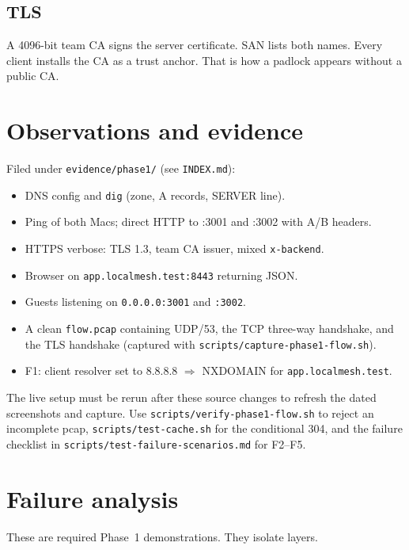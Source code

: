 \documentclass[11pt,a4paper]{article}
\begin{document}
\subsection{TLS}
A 4096-bit team CA signs the server certificate. SAN lists both names. Every client
installs the CA as a trust anchor. That is how a padlock appears without a public CA.

\section{Observations and evidence}
Filed under \texttt{evidence/phase1/} (see \texttt{INDEX.md}):

\begin{itemize}
  \item DNS config and \texttt{dig} (zone, A records, SERVER line).
  \item Ping of both Macs; direct HTTP to :3001 and :3002 with A/B headers.
  \item HTTPS verbose: TLS 1.3, team CA issuer, mixed \texttt{x-backend}.
  \item Browser on \texttt{app.localmesh.test:8443} returning JSON.
  \item Guests listening on \texttt{0.0.0.0:3001} and \texttt{:3002}.
  \item A clean \texttt{flow.pcap} containing UDP/53, the TCP three-way handshake,
        and the TLS handshake (captured with \texttt{scripts/capture-phase1-flow.sh}).
  \item F1: client resolver set to 8.8.8.8 $\Rightarrow$ NXDOMAIN for \texttt{app.localmesh.test}.
\end{itemize}

The live setup must be rerun after these source changes to refresh the dated
screenshots and capture. Use \texttt{scripts/verify-phase1-flow.sh} to reject an
incomplete pcap, \texttt{scripts/test-cache.sh} for the conditional 304, and the
failure checklist in \texttt{scripts/test-failure-scenarios.md} for F2--F5.

\section{Failure analysis}
These are required Phase~1 demonstrations. They isolate layers.
\end{document}
